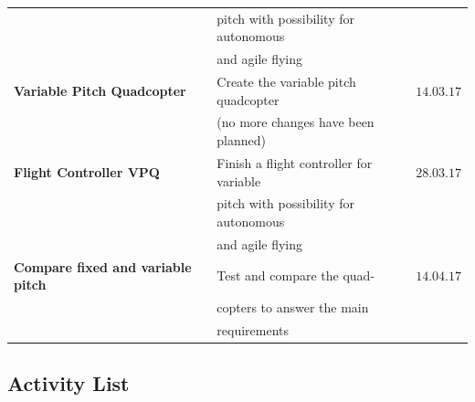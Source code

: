 \begin{table}[h]
\begin{tabular}{llc}
                                & pitch with possibility for autonomous & \\
                                & and agile flying & \\\rowcolor{gainsboro}
\textbf{Variable Pitch Quadcopter}  & Create the variable pitch quadcopter & $14.03.17$ \\\rowcolor{gainsboro}
                                    & (no more changes have been planned) & \\
\textbf{Flight Controller VPQ}  & Finish a flight controller for variable & $28.03.17$ \\
                            & pitch with possibility for autonomous & \\
                            & and agile flying & \\\rowcolor{gainsboro}
\textbf{Compare fixed and variable pitch}  & Test and compare the quad- & $14.04.17$ \\\rowcolor{gainsboro}
                                           & copters to answer the main & \\\rowcolor{gainsboro}
                                           & requirements & 
\end{tabular}                                                               
\end{table}

\subsection{Activity List}

